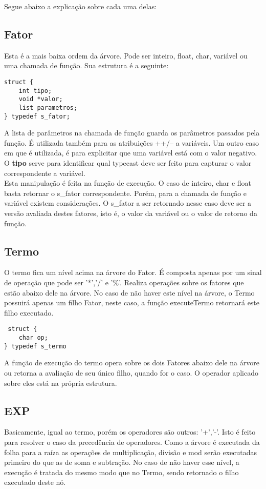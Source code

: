 \documentclass[a4paper,10pt]{article}
\begin{document}
Segue abaixo a explicação sobre cada uma delas:

\subsection{Fator}
Esta é a mais baixa ordem da árvore. Pode ser inteiro, float, char, variável ou uma chamada de função. Sua estrutura é a seguinte:

\begin{lstlisting}
struct {
	int tipo;
	void *valor;
	list parametros;
} typedef s_fator;
\end{lstlisting}

A lista de parâmetros na chamada de função guarda os parâmetros passados pela função. É utilizada também para as atribuições ++/-- a variáveis. Um outro caso em que é utilizada,
é para explicitar que uma variável está com o valor negativo. 
O \textbf{tipo} serve para identificar qual typecast deve ser feito para capturar o valor correspondente a variável.\\
Esta manipulação é feita na função de execução. O caso de inteiro, char e float basta retornar o s\_fator correspondente. Porém, para a chamada de função e variável existem
considerações. O s\_fator a ser retornado nesse caso deve ser a versão avaliada destes fatores, isto é, o valor da variável ou o valor de retorno da função.
\subsection{Termo}

O termo fica um nível acima na árvore do Fator. É composta apenas por um sinal de operação que pode ser '*','/' e '\%'. Realiza operações sobre os fatores que estão abaixo dele na árvore.
No caso de não haver este nível na árvore, o Termo possuirá apenas um filho Fator, neste caso, a função executeTermo retornará este filho executado.

\begin{lstlisting}
 struct {
	char op;
} typedef s_termo
\end{lstlisting}

A função de execução do termo opera sobre os dois Fatores abaixo dele na árvore ou retorna a avaliação de seu único filho, quando for o caso. 
O operador aplicado sobre eles está na própria estrutura.

\subsection{EXP}
Basicamente, igual ao termo, porém os operadores são outros: '+','-'. Isto é feito para resolver o caso da precedência de operadores. Como a árvore é executada da folha para a raíza as operações de multiplicação, divisão e mod serão executadas primeiro do que as de soma e subtração.
No caso de não haver esse nível, a execução é tratada do mesmo modo que no Termo, sendo retornado o filho executado deste nó.
\end{document}
